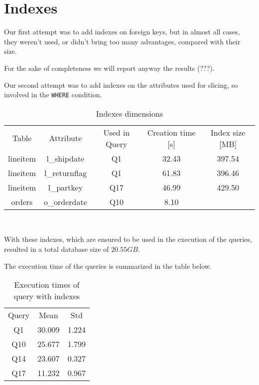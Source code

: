 \section{Indexes}

Our first attempt was to add indexes on foreign keys, but in almost all cases, they weren't used, or didn't bring too many advantages, compared with their size.

For the sake of completeness we will report anyway the results (???).

Our second attempt was to add indexes on the attributes used for slicing, so involved in the \verb|WHERE| condition.

\begin{table}[H]
\centering
\begin{tabular}{c|c|c|c|c}
\rowcolor{blue!50} Table & Attribute & Used in Query & Creation time [s] & Index size [MB]\\
\rowcolor{gray!10} lineitem & l\_shipdate & Q1 & 32.43 & 397.54\\ 
\rowcolor{white} lineitem & l\_returnflag & Q1 & 61.83 & 396.46\\ 
\rowcolor{gray!10} lineitem & l\_partkey & Q17 & 46.99 & 429.50\\ 
\rowcolor{white} orders & o\_orderdate & Q10 & 8.10 & \\ 
\end{tabular}\\[0.5cm]
    \caption{Indexes dimensions}
\end{table}

With these indexes, which are ensured to be used in the execution of the queries, resulted in a total database size of $20.55 GB$.

The execution time of the queries is summarized in the table below.

\begin{table}[H]
\centering
\begin{tabular}{c|c|c}
\rowcolor{blue!50} Query & Mean & Std\\
\rowcolor{gray!10} Q1     &30.009                &1.224\\
\rowcolor{white} Q10    &25.677               &1.799\\
\rowcolor{gray!10} Q14    &23.607               &0.327\\
\rowcolor{white} Q17    &11.232               &0.967 \\
\end{tabular}\\[0.5cm]
    \caption{Execution times of query with indexes}
    \label{tab:idx_exec_time}
\end{table}

